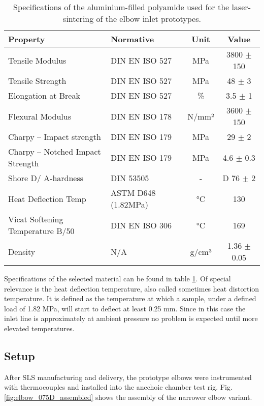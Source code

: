 \begin{table}[b!]
  \centering
  \caption[Specifications of the aluminium-filled polyamide]{Specifications of the aluminium-filled polyamide used for the laser-sintering of the elbow inlet prototypes.}
  	\footnotesize
    \begin{tabular}{llcc}
    \addlinespace
    \toprule
    \bf Property & \bf Normative & \bf Unit & \bf Value \\
    \midrule
    Tensile Modulus & DIN EN ISO 527 & MPa   & 3800 $\pm$ 150 \\
    Tensile Strength & DIN EN ISO 527 & MPa   & 48 $\pm$ 3 \\
    Elongation at Break & DIN EN ISO 527 & \%    & 3.5 $\pm$ 1 \\
    Flexural Modulus & DIN EN ISO 178 & N/mm² & 3600 $\pm$ 150 \\
    Charpy – Impact strength & DIN EN ISO 179 & MPa   & 29 $\pm$ 2 \\
    Charpy – Notched Impact Strength & DIN EN ISO 179 & MPa   & 4.6 $\pm$ 0.3 \\
    Shore D/ A-hardness & DIN 53505 &   -   & D 76 $\pm$ 2 \\
    Heat Deflection Temp & ASTM D648
(1.82MPa) & °C    & 130 \\
    Vicat Softening Temperature B/50 & DIN EN ISO 306 & °C    & 169 \\
    Density &   N/A    & g/cm³ & 1.36 $\pm$ 0.05 \\
    \bottomrule
    \end{tabular}
  \label{tab:alumide_data}
\end{table}

Specifications of the selected material can be found in table \ref{tab:alumide_data}. Of special relevance is the heat deflection temperature, also called sometimes heat distortion temperature. It is defined as the temperature at which a sample, under a defined load of 1.82 MPa, will start to deflect at least 0.25 mm. Since in this case the inlet line is approximately at ambient pressure no problem is expected until more elevated temperatures.

\subsection{Setup}

After SLS manufacturing and delivery, the prototype elbows were instrumented with thermocouples and installed into the anechoic chamber test rig. Fig. \ref{fig:elbow_075D_assembled} shows the assembly of the narrower elbow variant.

